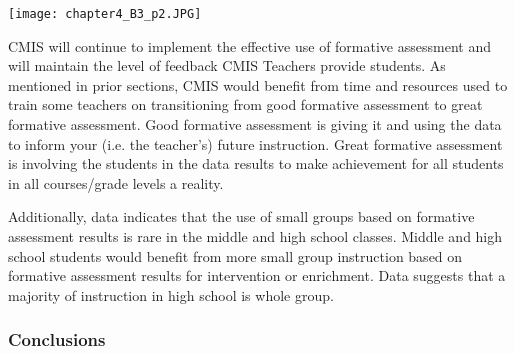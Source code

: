 \begin{findings}
{\centering\texttt{[image: chapter4\_B3\_p2.JPG]}}


CMIS will continue to implement the effective use of formative assessment and will maintain the level of feedback CMIS Teachers provide students. As mentioned in prior sections, CMIS would benefit from time and resources used to train some teachers on transitioning from good formative assessment to great formative assessment. Good formative assessment is giving it and using the data to inform your (i.e. the teacher’s) future instruction. Great formative assessment is involving the students in the data results to make achievement for all students in all courses/grade levels a reality.

Additionally, data indicates that the use of small groups based on formative assessment results is rare in the middle and high school classes. Middle and high school students would benefit from more small group instruction based on formative assessment results for intervention or enrichment. Data suggests that a majority of instruction in high school is whole group. 
\end{findings}

\subsubsection{Conclusions}


